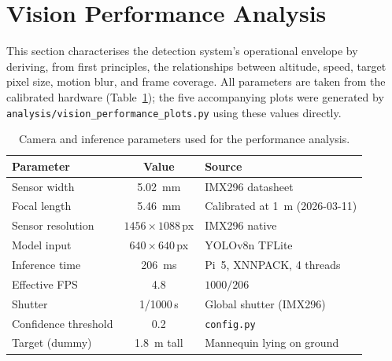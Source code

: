 
\section{Vision Performance Analysis}\label{sec:vision-perf}

This section characterises the detection system's operational envelope by
deriving, from first principles, the relationships between altitude, speed,
target pixel size, motion blur, and frame coverage.  All parameters are taken
from the calibrated hardware (Table~\ref{tab:vision-params}); the five
accompanying plots were generated by \texttt{analysis/vision\_performance\_plots.py}
using these values directly.

\begin{table}[ht]
  \centering
  \caption{Camera and inference parameters used for the performance analysis.}\label{tab:vision-params}
  \begin{tabular}{@{}l c l@{}}
    \toprule
    \textbf{Parameter} & \textbf{Value} & \textbf{Source} \\
    \midrule
    Sensor width            & \SI{5.02}{\milli\metre} & IMX296 datasheet \\
    Focal length            & \SI{5.46}{\milli\metre} & Calibrated at \SI{1}{\metre} (2026-03-11) \\
    Sensor resolution       & $1456 \times 1088$\,px  & IMX296 native \\
    Model input             & $640 \times 640$\,px    & YOLOv8n TFLite \\
    Inference time          & \SI{206}{\milli\second}  & Pi~5, XNNPACK, 4 threads \\
    Effective FPS           & 4.8                      & $1000 / 206$ \\
    Shutter                 & 1/1000\,s               & Global shutter (IMX296) \\
    Confidence threshold    & 0.2                      & \texttt{config.py} \\
    Target (dummy)          & \SI{1.8}{\metre} tall    & Mannequin lying on ground \\
    \bottomrule
  \end{tabular}
\end{table}

